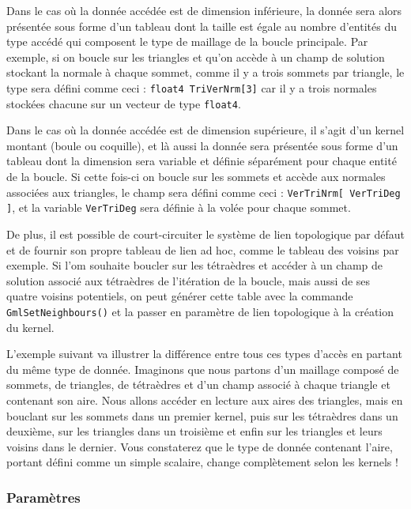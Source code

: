 \documentclass[a4paper,12pt]{article}
\begin{document}
Dans le cas où la donnée accédée est de dimension inférieure, la donnée sera alors présentée sous forme d'un tableau dont la taille est égale au nombre d'entités du type accédé qui composent le type de maillage de la boucle principale. Par exemple, si on boucle sur les triangles et qu'on accède à un champ de solution stockant la normale à chaque sommet, comme il y a trois sommets par triangle, le type sera défini comme ceci : {\tt float4 TriVerNrm[3]} car il y a trois normales stockées chacune sur un vecteur de type {\tt float4}.

Dans le cas où la donnée accédée est de dimension supérieure, il s'agit d'un kernel montant (boule ou coquille), et là aussi la donnée sera présentée sous forme d'un tableau dont la dimension sera variable et définie séparément pour chaque entité de la boucle. Si cette fois-ci on boucle sur les sommets et accède aux normales associées aux triangles, le champ sera défini comme ceci : {\tt VerTriNrm[ VerTriDeg ]}, et la variable {\tt VerTriDeg} sera définie à la volée pour chaque sommet.

De plus, il est possible de court-circuiter le système de lien topologique par défaut et de fournir son propre tableau de lien ad hoc, comme le tableau des voisins par exemple.
Si l'om souhaite boucler sur les tétraèdres et accéder à un champ de solution associé aux tétraèdres de l'itération de la boucle, mais aussi de ses quatre voisins potentiels, on peut générer cette table avec la commande {\tt GmlSetNeighbours()} et la passer en paramètre de lien topologique à la création du kernel.

L'exemple suivant va illustrer la différence entre tous ces types d'accès en partant du même type de donnée.
Imaginons que nous partons d'un maillage composé de sommets, de triangles, de tétraèdres et d'un champ associé à chaque triangle et contenant son aire. Nous allons accéder en lecture aux aires des triangles, mais en bouclant sur les sommets dans un premier kernel, puis sur les tétraèdres dans un deuxième, sur les triangles dans un troisième et enfin sur les triangles et leurs voisins dans le dernier. Vous constaterez que le type de donnée contenant l'aire, portant défini comme un simple scalaire, change complètement selon les kernels !

\subsubsection*{Paramètres}
\end{document}
